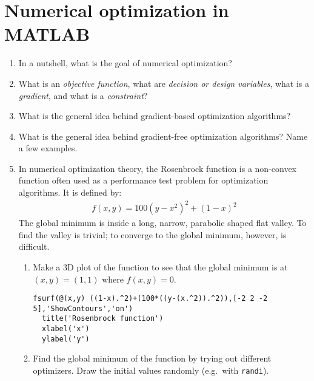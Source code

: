 \section[Numerical optimization in MATLAB]{Numerical optimization in MATLAB\label{ex:MatlabNumericalOptimization}}

\begin{enumerate}

\item
In a nutshell, what is the goal of numerical optimization?

\item
What is an \emph{objective function}, what are \emph{decision or design variables}, what is a \emph{gradient}, and what is a \emph{constraint}?

\item
What is the general idea behind gradient-based optimization algorithms?

\item
What is the general idea behind gradient-free optimization algorithms? Name a few examples.

\item
In numerical optimization theory, the Rosenbrock function is a non-convex function
  often used as a performance test problem for optimization algorithms.
It is defined by:
\begin{align*}
f(x,y) = 100{(y-x^2)}^2 + {(1-x)}^2
\end{align*}
The global minimum is inside a long, narrow, parabolic shaped flat valley.
To find the valley is trivial;
  to converge to the global minimum, however, is difficult.

  \begin{enumerate}

  \item
  Make a 3D plot of the function to see that the global minimum is at \((x, y)=(1, 1)\) where \(f(x, y)=0\).
  \begin{lstlisting}[style=Matlab-editor,basicstyle=\mlttfamily\scriptsize]
  fsurf(@(x,y) ((1-x).^2)+(100*((y-(x.^2)).^2)),[-2 2 -2 5],'ShowContours','on')
  title('Rosenbrock function')
  xlabel('x')
  ylabel('y')
  \end{lstlisting}

  \item
  Find the global minimum of the function by trying out different optimizers.
  Draw the initial values randomly (e.g.\ with \texttt{randi}).

  \end{enumerate}


\end{enumerate}
